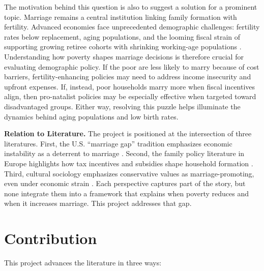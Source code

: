 The motivation behind this question is also to suggest a solution for a prominent topic. Marriage remains a central institution linking family formation with fertility. Advanced economies face unprecedented demographic challenges: fertility rates below replacement, aging populations, and the looming fiscal strain of supporting growing retiree cohorts with shrinking working-age populations \citep{BloomCanningFink2010, DoepkeTertilt2016}. Understanding how poverty shapes marriage decisions is therefore crucial for evaluating demographic policy. If the poor are less likely to marry because of cost barriers, fertility-enhancing policies may need to address income insecurity and upfront expenses. If, instead, poor households marry more when fiscal incentives align, then pro-natalist policies may be especially effective when targeted toward disadvantaged groups. Either way, resolving this puzzle helps illuminate the dynamics behind aging populations and low birth rates.

\noindent \textbf{Relation to Literature.}
The project is positioned at the intersection of three literatures. First, the U.S. “marriage gap” tradition emphasizes economic instability as a deterrent to marriage \citep{Wilson1987, Murray1994, EdinKefalas2005, Autor2019}. Second, the family policy literature in Europe highlights how tax incentives and subsidies shape household formation \citep{Steiner2011, EllwoodJencks2004, DoepkeKindermann2019}. Third, cultural sociology emphasizes conservative values as marriage-promoting, even under economic strain \citep{Cherlin2004, Lesthaeghe2010}. Each perspective captures part of the story, but none integrate them into a framework that explains when poverty reduces and when it increases marriage. This project addresses that gap.

\section*{Contribution}

This project advances the literature in three ways:

